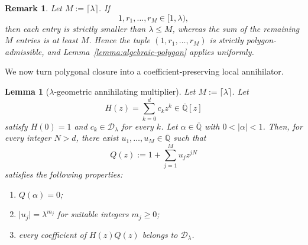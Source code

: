 \documentclass[10pt,a4paper]{amsart}
\newtheorem{lemma}[theorem]{Lemma}
\newtheorem{remark}[theorem]{Remark}
\numberwithin{equation}{section}
\newcommand{\Qbar}{\overline{\mathbb Q}}
\newcommand{\D}{\mathcal D}
\newcommand{\abs}[1]{\lvert #1\rvert}
\begin{document}
\begin{remark}\label{remark:number-of-sides}
Let $M:=\lceil\lambda\rceil$. If
\[
        1,r_1,\ldots,r_M\in[1,\lambda),
\]
then each entry is strictly smaller than $\lambda\leq M$, whereas the sum
of the remaining $M$ entries is at least $M$. Hence the tuple
$(1,r_1,\ldots,r_M)$ is strictly polygon-admissible, and
Lemma~\ref{lemma:algebraic-polygon} applies uniformly.
\end{remark}

We now turn polygonal closure into a coefficient-preserving local
annihilator.

\begin{lemma}[$\lambda$-geometric annihilating multiplier]\label{lemma:factor}
Let $M:=\lceil\lambda\rceil$. Let
\[
        H(z)=\sum_{k=0}^{d}c_kz^k\in\Qbar[z]
\]
satisfy $H(0)=1$ and $c_k\in\D_\lambda$ for every $k$. Let
$\alpha\in\Qbar$ with $0<\abs\alpha<1$. Then, for every integer $N>d$,
there exist $u_1,\ldots,u_M\in\Qbar$ such that
\begin{equation}\label{eq:factor-form}
        Q(z):=1+\sum_{j=1}^{M}u_jz^{jN}
\end{equation}
satisfies the following properties:
\begin{enumerate}[label=\textup{(\alph*)}]
\item $Q(\alpha)=0$;
\item $\abs{u_j}=\lambda^{m_j}$ for suitable integers $m_j\geq0$;
\item every coefficient of $H(z)Q(z)$ belongs to $\D_\lambda$.
\end{enumerate}
\end{lemma}
\end{document}
